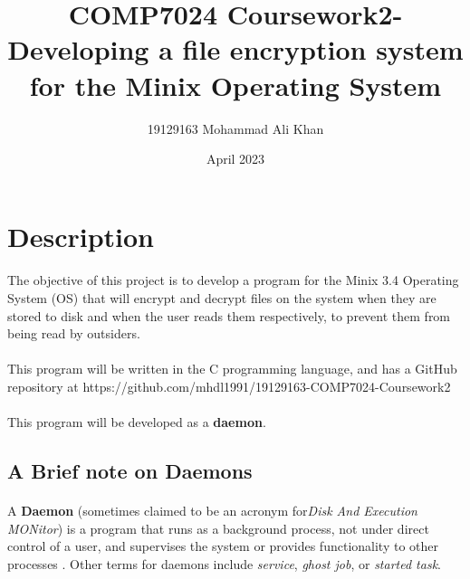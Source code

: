 \documentclass{article}
\title{COMP7024 Coursework2- Developing a file encryption system for the Minix Operating System}
\author{19129163 Mohammad Ali Khan}
\date{April 2023}
\begin{document}
    \setmainfont{Arial}
    
    \newpage
    \maketitle

\section{Description}
    \paragraph{}The objective of this project is to develop a program for the Minix 3.4 Operating System (OS) that will encrypt and decrypt files on the system when they are stored to disk and when the user reads them respectively, to prevent them from being read by outsiders.
    \paragraph{}This program will be written in the C programming language, and has a GitHub repository at https://github.com/mhdl1991/19129163-COMP7024-Coursework2
    \paragraph{}This program will be developed as a \textbf{daemon}.

    \subsection{A Brief note on Daemons}
        \paragraph{}A \textbf{Daemon} (sometimes claimed to be an acronym for\textit{Disk And Execution MONitor}) is a program that runs as a background process, not under direct control of a user, and supervises the system or provides functionality to other processes . Other terms for daemons include \textit{service}, \textit{ghost job}, or \textit{started task}.
\end{document}

